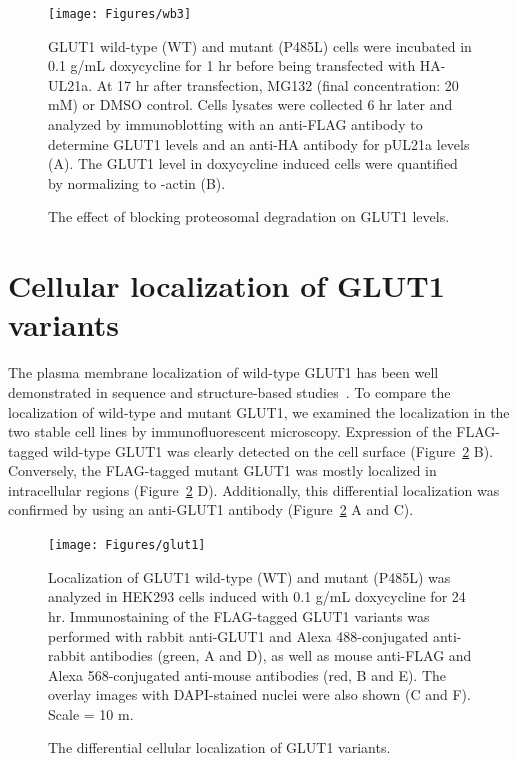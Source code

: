\begin{figure}[h]
\centering
\texttt{[image: Figures/wb3]}
\caption{The effect of blocking proteosomal degradation on GLUT1 levels.}
\vspace*{-3mm}
\small \justify
GLUT1 wild-type (WT) and mutant (P485L) cells were incubated in 0.1 \textmu g/mL doxycycline for 1 hr before being transfected with HA-UL21a. At 17 hr after transfection, MG132 (final concentration: 20 mM) or DMSO control. Cells lysates were collected 6 hr later and analyzed by immunoblotting with an anti-FLAG antibody to determine GLUT1 levels and an anti-HA antibody for pUL21a levels (A). The GLUT1 level in doxycycline induced cells were quantified by normalizing to \textbeta -actin (B).
\label{fig:wb3}
\end{figure}
\section{Cellular localization of GLUT1 variants}
The plasma membrane localization of wild-type GLUT1 has been well demonstrated in sequence and structure-based studies~\cite{Mueckler.2,Hresko,Hruz}.
To compare the localization of wild-type and mutant GLUT1, we examined the localization in the two stable cell lines by immunofluorescent microscopy. Expression of the FLAG-tagged wild-type GLUT1 was clearly detected on the cell surface (Figure~\ref{fig:glut1} B). Conversely, the FLAG-tagged mutant GLUT1 was mostly localized in intracellular regions (Figure~\ref{fig:glut1} D). Additionally, this differential localization was confirmed by using an anti-GLUT1 antibody (Figure~\ref{fig:glut1} A and C).

\begin{figure}[h]
\centering
\texttt{[image: Figures/glut1]}
\caption{The differential cellular localization of GLUT1 variants.}
\vspace*{-3mm}
\small \justify
Localization of GLUT1 wild-type (WT) and mutant (P485L) was analyzed in HEK293 cells induced with 0.1 \textmu g/mL doxycycline for 24 hr. Immunostaining of the FLAG-tagged GLUT1 variants was performed with rabbit anti-GLUT1 and Alexa 488-conjugated anti-rabbit antibodies (green, A and D), as well as mouse anti-FLAG and Alexa 568-conjugated anti-mouse antibodies (red, B and E). The overlay images with DAPI-stained nuclei were also shown (C and F). Scale = 10 \textmu m.
\label{fig:glut1}
\end{figure}
